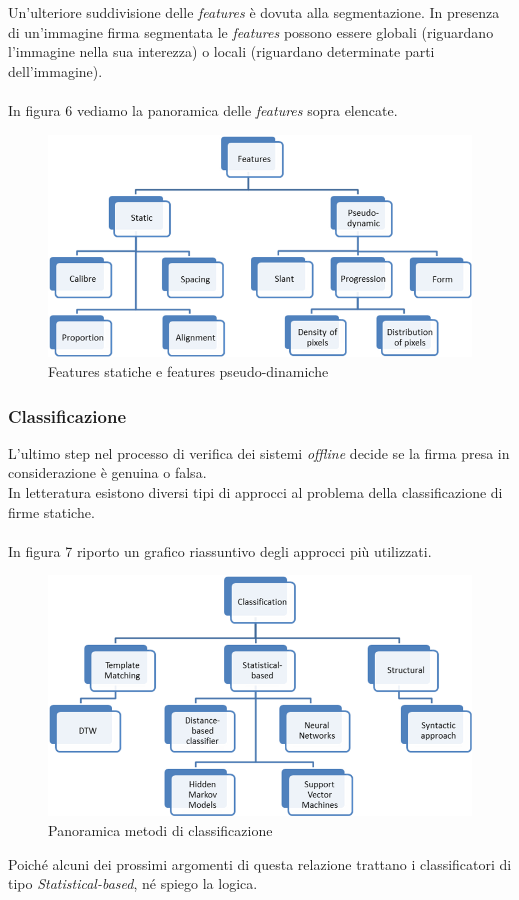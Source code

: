 Un'ulteriore suddivisione delle \emph{features} è dovuta alla segmentazione. In presenza di un'immagine firma segmentata le \emph{features} possono essere globali (riguardano l'immagine nella sua interezza) o locali (riguardano determinate parti dell'immagine).\\\\
In figura 6 vediamo la panoramica delle \emph{features} sopra elencate.
\begin{figure}[H]
\centering
\includegraphics[scale=0.7]{../Logo&Header/featuresStaticPseudoD.png}
\caption{Features statiche e features pseudo-dinamiche}
\end{figure}
\subsubsection*{Classificazione}
\label{2.1.3.4}
L'ultimo step nel processo di verifica dei sistemi \emph{offline} decide se la firma presa in considerazione è genuina o falsa.\\
In letteratura esistono diversi tipi di approcci al problema della classificazione di firme statiche.\\\\
In figura 7 riporto un grafico riassuntivo degli approcci più utilizzati.\\
\begin{figure}[H]
\centering
\includegraphics[scale=0.7]{../Logo&Header/classificatori.png}
\caption{Panoramica metodi di classificazione}
\end{figure}
Poiché alcuni dei prossimi argomenti di questa relazione trattano i classificatori di tipo \emph{Statistical-based}, né spiego la logica.
